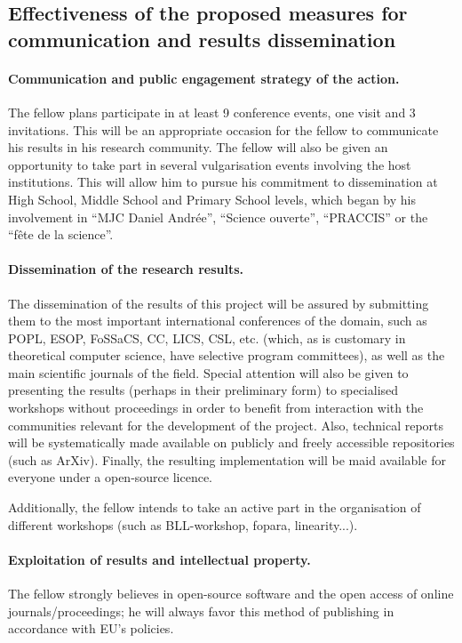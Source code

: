 \documentclass{article}[11pt]
\begin{document}
\subsection{Effectiveness of the proposed measures for communication and results dissemination}

\paragraph{Communication and public engagement strategy of the action.} 
The fellow plans participate in at least 9 conference events, one visit and 3 invitations. This will be an appropriate occasion for the fellow to communicate his results in his research community. The fellow will also be given an opportunity to take part in several vulgarisation events involving the host institutions. This will allow him to pursue his commitment to dissemination at High School, Middle School and Primary School levels, which began by his involvement in “MJC Daniel Andrée”, ``Science ouverte'', ``PRACCIS'' or the “fête de la science”.


\paragraph{Dissemination of the research results.} 
The dissemination of the results of this project will be assured by submitting them to the most important international conferences of the domain, such as POPL, ESOP, FoSSaCS, CC, LICS, CSL, etc. (which, as is customary in theoretical computer science, have selective program committees), as well as the main scientific journals of the field. Special attention will also be given to presenting the results (perhaps in their preliminary form) to specialised workshops without proceedings in order to benefit from interaction with the communities relevant for the development of the project. Also, technical reports will be systematically made available on publicly and freely accessible repositories (such as ArXiv). Finally, the resulting implementation will be maid available for everyone under a open-source licence.

Additionally, the fellow intends to take an active part in the organisation of different workshops (such as BLL-workshop, fopara, linearity...).

\paragraph{Exploitation of results and intellectual property.}
The fellow strongly believes in open-source software and the open access of online journals/proceedings; he will always favor this method of publishing in accordance with EU’s policies. 
\end{document}
